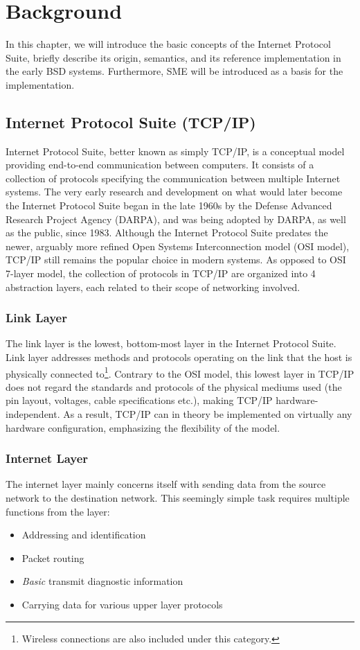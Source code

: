 \chapter{Background}

In this chapter, we will introduce the basic concepts of the Internet Protocol
Suite, briefly describe its origin, semantics, and its reference implementation
in the early BSD systems.
Furthermore, SME will be introduced as a basis for the implementation.


\section{Internet Protocol Suite (TCP/IP)}
Internet Protocol Suite, better known as simply TCP/IP, is a conceptual
model providing end-to-end communication between computers. It consists of
a collection of protocols specifying the communication between multiple
Internet systems\cite{RFC1122}.  The very early research and development
on what would later become the Internet Protocol Suite began in the late 1960s
by the Defense Advanced Research Project Agency (DARPA), and was being
adopted by DARPA, as well as the public, since 1983\cite{DARPA_internet}.
Although the Internet Protocol Suite predates the newer, arguably more
refined Open Systems Interconnection model (OSI model), TCP/IP still
remains the popular choice in modern systems.  As opposed to OSI 7-layer
model\cite{X.200}, the collection of protocols in TCP/IP are organized
into 4 abstraction layers, each related to their scope of networking
involved.

\subsection{Link Layer}
The link layer is the lowest, bottom-most layer in the Internet Protocol Suite.
Link layer addresses methods and protocols operating on the link that the host
is physically connected to\footnote{Wireless connections are also included
under this category.}. Contrary to the OSI model, this lowest layer in TCP/IP
does not regard the standards and protocols of the physical mediums used (the
pin layout, voltages, cable specifications etc.), making TCP/IP hardware-independent.
As a result, TCP/IP can in theory be implemented on virtually any hardware
configuration, emphasizing the flexibility of the model.

\subsection{Internet Layer}
The internet layer mainly concerns itself with sending data from the source
network to the destination network. This seemingly simple task requires multiple
functions from the layer:
\begin{itemize}
    \item Addressing and identification
    \item Packet routing
    \item \emph{Basic} transmit diagnostic information
    \item Carrying data for various upper layer protocols
\end{itemize}

